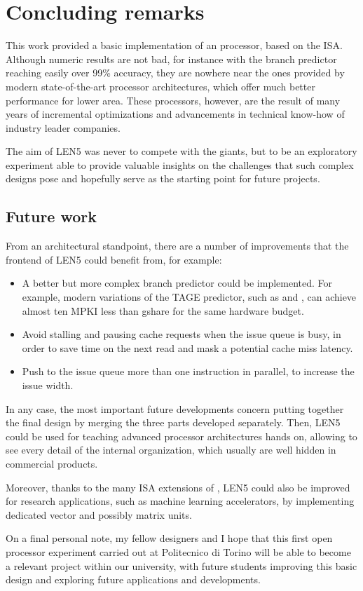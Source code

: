\chapter{Concluding remarks}
This work provided a basic implementation of an \ooo processor, based on the \riscv \ac{ISA}. Although numeric results are not bad, for instance with the branch predictor reaching easily over 99\% accuracy, they are nowhere near the ones provided by modern state-of-the-art processor architectures, which offer much better performance for lower area. These processors, however, are the result of many years of incremental optimizations and advancements in technical know-how of industry leader companies. 

The aim of LEN5 was never to compete with the giants, but to be an exploratory experiment able to provide valuable insights on the challenges that such complex designs pose and hopefully serve as the starting point for future \riscv projects.

\section{Future work}
From an architectural standpoint, there are a number of improvements that the frontend of LEN5 could benefit from, for example:
\begin{itemize}
  \item A better but more complex branch predictor could be implemented. For example, modern variations of the \ac{TAGE} predictor, such as \cite{parasanna17} and \cite{michaud18}, can achieve almost ten MPKI less than gshare for the same hardware budget.
  \item Avoid stalling and pausing cache requests when the issue queue is busy, in order to save time on the next read and mask a potential cache miss latency.
  \item Push to the issue queue more than one instruction in parallel, to increase the issue width.
\end{itemize}

In any case, the most important future developments concern putting together the final design by merging the three parts developed separately. Then, LEN5 could be used for teaching advanced processor architectures hands on, allowing to see every detail of the internal organization, which usually are well hidden in commercial products.

Moreover, thanks to the many \ac{ISA} extensions of \riscv, LEN5 could also be improved for research applications, such as machine learning accelerators, by implementing dedicated vector and possibly matrix units.

On a final personal note, my fellow designers and I hope that this first open processor experiment carried out at Politecnico di Torino will be able to become a relevant project within our university, with future students improving this basic design and exploring future applications and developments.